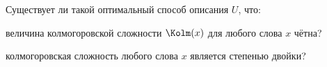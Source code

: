 Существует ли такой оптимальный способ описания $U$, что:
\begin{enumcyr}
    \item величина колмогоровской сложности $\Kolm(x)$ для любого слова $x$ чётна?
    \item колмогоровская сложность любого слова $x$ является степенью двойки?
\end{enumcyr}
